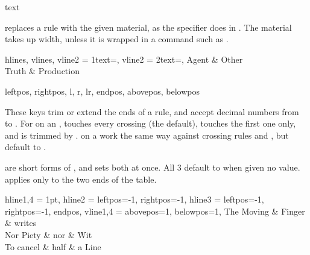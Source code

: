 \begin{codedescribe}[
    key,
    new=2021F
  ]{text}
  \begin{codesyntax}
  \end{codesyntax}
   replaces a rule with the given material, as the \vrb{!} specifier does in . The material takes up width, unless it is wrapped in a command such as .

  \begin{codestore}[st=rules:text]
    \begin{tblr}{
        hlines, vlines,
        vline{2} = {1}{text=\clap{$\rightarrow$}},
        vline{2} = {2}{text=\clap{//}},
      }
      Agent & Other      \\
      Truth & Production
    \end{tblr}\end{codestore}
  \begin{center}
  \end{center}
\end{codedescribe}

\begin{codedescribe}[
    key,
    new=2021N
  ]{leftpos, rightpos, l, r, lr, endpos, abovepos, belowpos}
  \begin{codesyntax}
  \end{codesyntax}
  These keys trim or extend the ends of a rule, and accept decimal numbers from  to . For  on an ,  touches every crossing  (the default),  touches the first one only, and  is trimmed by .  on a  work the same way against crossing rules and , but default to .

   are short forms of , and  sets both at once. All 3 default to  when given no value.  applies  only to the two ends of the table.

  \begin{codestore}[st=rules:pos]
    \begin{tblr}{
      hline{1,4} = {1pt},
      hline{2} = {leftpos=-1, rightpos=-1},
      hline{3} = {leftpos=-1, rightpos=-1, endpos},
      vline{1,4} = {abovepos=1, belowpos=1},
        }
      The Moving & Finger & writes \\
      Nor Piety  & nor    & Wit    \\
      To cancel  & half   & a Line
    \end{tblr}\end{codestore}
  \begin{center}
  \end{center}
\end{codedescribe}

